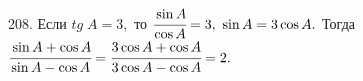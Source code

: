 208. Если $tg\; A=3,$ то $\cfrac{\sin A}{\cos A}=3,\ \sin A=3\cos A.$ Тогда $\cfrac{\sin A +\cos A}{\sin A -\cos A}=\cfrac{3\cos A +\cos A}{3\cos A -\cos A}=2.$\\
